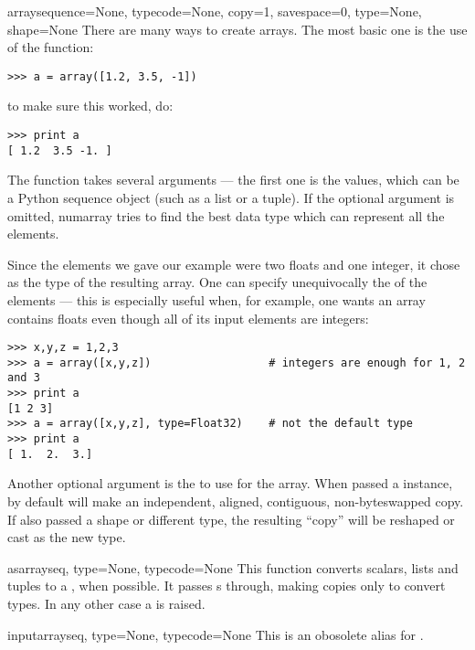\begin{funcdesc}{array}{sequence=None, typecode=None, copy=1, savespace=0,
    type=None, shape=None}
   There are many ways to create arrays. The most basic one is the use of the
    function:
\begin{verbatim}
>>> a = array([1.2, 3.5, -1])
\end{verbatim}
   to make sure this worked, do:
\begin{verbatim}
>>> print a
[ 1.2  3.5 -1. ]
\end{verbatim}
   The  function takes several arguments --- the first one is
   the values, which can be a Python sequence object (such as a list or a
   tuple).  If the optional argument  is omitted, numarray tries to
   find the best data type which can represent all the elements. 
   
   Since the elements we gave our example were two floats and one integer, it
   chose  as the type of the resulting array. One can specify
   unequivocally the  of the elements --- this is especially 
   useful when, for example, one wants an array contains floats even
   though all of its input elements are integers:
\begin{verbatim}
>>> x,y,z = 1,2,3
>>> a = array([x,y,z])                  # integers are enough for 1, 2 and 3
>>> print a
[1 2 3]
>>> a = array([x,y,z], type=Float32)    # not the default type
>>> print a
[ 1.  2.  3.]
\end{verbatim}
    Another optional argument is the  to use for the array.  When
    passed a  instance, by default  will make
    an independent, aligned, contiguous, non-byteswapped copy.  If also passed
    a shape or different type, the resulting ``copy'' will be reshaped or
    cast as the new type.
\end{funcdesc}

\begin{funcdesc}{asarray}{seq, type=None, typecode=None}
   This function converts scalars, lists and tuples to a , when
   possible. It passes s through, making copies only to
   convert types.  In any other case a  is raised.
\end{funcdesc}

\begin{funcdesc}{inputarray}{seq, type=None, typecode=None}
  This is an obosolete alias for .
\end{funcdesc}


